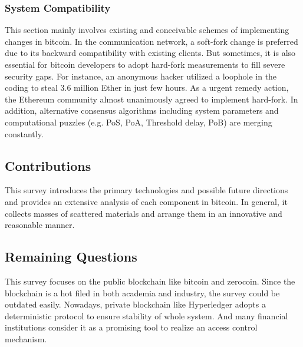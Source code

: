 \documentclass[conference]{IEEEtran}
\begin{document}
\subsubsection{System Compatibility}
This section mainly involves existing and conceivable schemes of implementing changes in bitcoin.
%
In the communication network, a soft-fork change is preferred due to its backward compatibility with existing clients.
%
But sometimes, it is also essential for bitcoin developers to adopt hard-fork measurements to fill severe security gaps.
%
For instance, an anonymous hacker utilized a loophole in the coding to steal 3.6 million Ether in just few hours. 
%
As a urgent remedy action, the Ethereum community almost unanimously agreed to implement hard-fork. 
%
In addition, alternative consensus algorithms including system parameters and computational puzzles (e.g. PoS\cite{king2012ppcoin}, PoA\cite{gunnam2008next}, Threshold delay\cite{Dfinity}, PoB\cite{Slimcoin}) are merging constantly.  


\subsection{Contributions}
This survey introduces the primary technologies and possible future directions and provides an extensive analysis of each component in bitcoin. 
%
In general, it collects masses of scattered materials and arrange them in an innovative and reasonable manner. 

\subsection{Remaining Questions}
This survey focuses on the public blockchain like bitcoin and zerocoin. 
%
Since the blockchain is a hot filed in both academia and industry, the survey could be outdated easily.
%
Nowadays, private blockchain like Hyperledger\cite{androulaki2018hyperledger} adopts a deterministic protocol to ensure stability of whole system.
%
And many financial institutions consider it as a promising tool to realize an access control mechanism.




\end{document}
